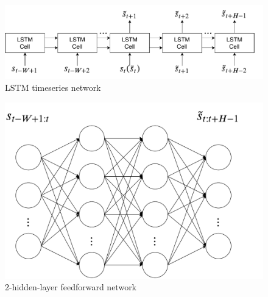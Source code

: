 \begin{figure}[ht]
\vskip 0.2in
\begin{center}
\centerline{\includegraphics[width=0.8\columnwidth]{figures/appendix/model/lstm.pdf}}
\caption{LSTM timeseries network} 
\label{fig:lstm}
\end{center}
\vskip -0.2in
\end{figure}

\begin{figure}[ht]
\vskip 0.2in
\begin{center}
\centerline{\includegraphics[width=0.5\columnwidth]{figures/appendix/model/DNN.pdf}}
\caption{2-hidden-layer feedforward network} 
\label{fig:DNN}
\end{center}
\vskip -0.2in
\end{figure}